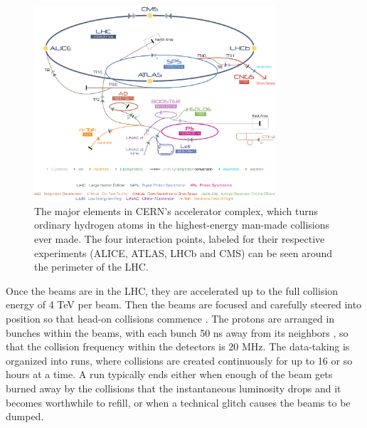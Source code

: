\begin{figure}
	\centering
	\includegraphics[width=0.8\textwidth]{ATLASDetector/images/Cern-Accelerator-Complex.pdf}
	\caption{ The major elements in CERN's accelerator complex, which turns ordinary hydrogen atoms in the highest-energy man-made collisions ever made. The four interaction points, labeled for their respective experiments (ALICE, ATLAS, LHCb and CMS) can be seen around the perimeter of the LHC. \label{fig:accelerator_complex}}
\end{figure}



Once the beams are in the LHC, they are accelerated up to the full collision energy of 4 TeV 
per beam.  Then the beams are focused  and carefully steered into position so that head-on collisions commence
.  The protons are arranged in bunches within the beams, with each bunch 50 ns away from its neighbors
, so that the collision frequency within the detectors is 20 MHz.  The data-taking is organized into 
runs, where collisions are created continuously for up to 16 or so hours at a time.  A run 
typically ends either when enough of the beam gets burned away by the collisions that the instantaneous luminosity drops and 
it becomes worthwhile to refill, or when a technical glitch causes the beams to be dumped.


